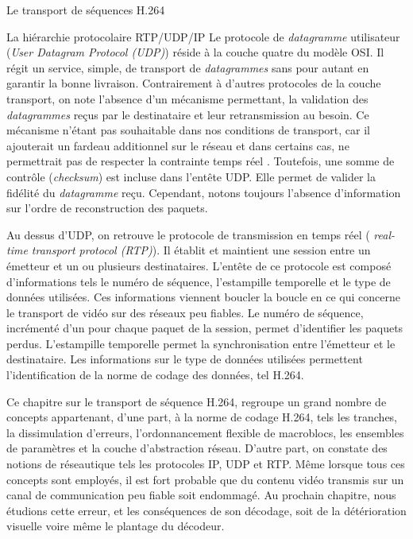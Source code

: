 \documentclass[letterpaper, twoside, 12pt,memoire]{thETS}
\newcommand{\ang}[1]{(\textit{#1})}
\begin{document}
\begin{chapter}{Le transport de séquences H.264}
\begin{section}{La hiérarchie protocolaire RTP/UDP/IP}
Le protocole de \textit{datagramme} utilisateur \ang{User Datagram Protocol
(UDP)} réside à la couche quatre du modèle OSI. Il régit un service, simple, de
transport de \textit{datagrammes} sans pour autant en garantir la bonne
livraison. Contrairement à d'autres protocoles de la couche transport, on note
l'absence d'un mécanisme permettant, la validation des \textit{datagrammes}
reçus par le destinataire et leur retransmission au besoin. Ce mécanisme n'étant
pas souhaitable dans nos conditions de transport, car il ajouterait un fardeau
additionnel sur le réseau et dans certains cas, ne permettrait pas de
respecter la contrainte temps réel \citep{Wenger2003}. Toutefois, une somme de
contrôle \ang{checksum} est incluse dans l'entête UDP. Elle permet de valider la
fidélité du \textit{datagramme} reçu. Cependant, notons toujours l'absence
d'information sur l'ordre de reconstruction des paquets.

Au dessus d'UDP, on retrouve le protocole de transmission en temps réel \ang{
real-time transport protocol (RTP)}. Il établit et maintient une session entre
un émetteur et un ou plusieurs destinataires. L'entête de ce protocole est
composé d'informations tels le numéro de séquence, l'estampille temporelle et le
type de données utilisées. Ces informations viennent boucler la boucle en ce qui
concerne le transport de vidéo sur des réseaux peu fiables. Le numéro de
séquence, incrémenté d'un pour chaque paquet de la session, permet d'identifier
les paquets perdus. L'estampille temporelle permet la synchronisation entre
l'émetteur et le destinataire. Les informations sur le type de données utilisées
permettent l'identification de la norme de codage des données, tel H.264.
\end{section}

Ce chapitre sur le transport de séquence H.264, regroupe un grand nombre de
concepts appartenant, d'une part, à la norme de codage H.264, tels les tranches,
la dissimulation d'erreurs, l'ordonnancement flexible de macroblocs, les
ensembles de paramètres et la couche d'abstraction réseau. D'autre part, on
constate des notions de réseautique tels les protocoles IP, UDP et RTP. Même
lorsque tous ces concepts sont employés, il est fort probable que du contenu
vidéo transmis sur un canal de communication peu fiable soit endommagé. Au
prochain chapitre, nous étudions cette erreur, et les conséquences de son
décodage, soit de la détérioration visuelle voire même le plantage du décodeur.

\end{chapter}



\end{document}
